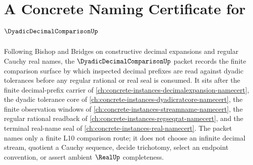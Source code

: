 \chapter{A Concrete Naming Certificate for $\DyadicDecimalComparisonUp$}
\label{ch:concrete-instances-dyadic-decimal-comparison-namecert}

Following Bishop and Bridges on constructive decimal expansions and regular Cauchy real names, the $\DyadicDecimalComparisonUp$ packet records the finite comparison surface by which inspected decimal prefixes are read against dyadic tolerances before any regular rational or real seal is consumed. It sits after the finite decimal-prefix carrier of \autoref{ch:concrete-instances-decimalexpansion-namecert}, the dyadic tolerance core of \autoref{ch:concrete-instances-dyadicratcore-namecert}, the finite observation windows of \autoref{ch:concrete-instances-streamname-namecert}, the regular rational readback of \autoref{ch:concrete-instances-regseqrat-namecert}, and the terminal real-name seal of \autoref{ch:concrete-instances-real-namecert}. The packet names only a finite L10 comparison route; it does not choose an infinite decimal stream, quotient a Cauchy sequence, decide trichotomy, select an endpoint convention, or assert ambient $\RealUp$ completeness.

